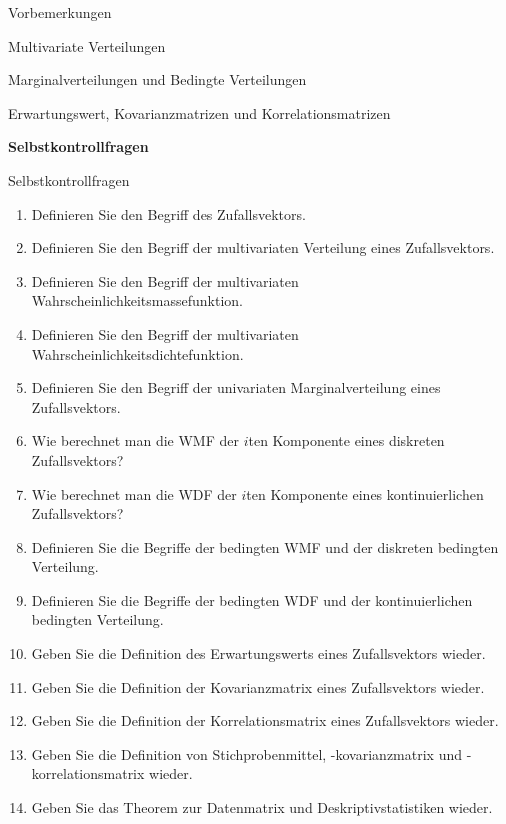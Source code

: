 \documentclass[
  8pt,
  ignorenonframetext,
]{beamer}
\begin{document}
\begin{frame}{}
\protect\hypertarget{section-7}{}
\large
{}
\vfill

Vorbemerkungen

Multivariate Verteilungen

Marginalverteilungen und Bedingte Verteilungen

Erwartungswert, Kovarianzmatrizen und Korrelationsmatrizen

\textbf{Selbstkontrollfragen} \vfill
\end{frame}

\begin{frame}{Selbstkontrollfragen}
\protect\hypertarget{selbstkontrollfragen}{}
\footnotesize
{}
\begin{enumerate}
\item Definieren Sie den Begriff des Zufallsvektors.
\item Definieren Sie den Begriff der multivariaten Verteilung eines Zufallsvektors.
\item Definieren Sie den Begriff der multivariaten Wahrscheinlichkeitsmassefunktion.
\item Definieren Sie den Begriff der multivariaten Wahrscheinlichkeitsdichtefunktion.
\item Definieren Sie den Begriff der univariaten Marginalverteilung eines Zufallsvektors.
\item Wie berechnet man die WMF der $i$ten Komponente eines diskreten Zufallsvektors?
\item Wie berechnet man die WDF der $i$ten Komponente eines kontinuierlichen Zufallsvektors?
\item Definieren Sie die Begriffe der bedingten WMF und der diskreten bedingten Verteilung.
\item Definieren Sie die Begriffe der bedingten WDF und der kontinuierlichen bedingten Verteilung.
\item Geben Sie die Definition des Erwartungswerts eines Zufallsvektors wieder.
\item Geben Sie die Definition der Kovarianzmatrix eines Zufallsvektors wieder.
\item Geben Sie die Definition der Korrelationsmatrix eines Zufallsvektors wieder.
\item Geben Sie die Definition von Stichprobenmittel, -kovarianzmatrix und -korrelationsmatrix wieder.
\item Geben Sie das Theorem zur Datenmatrix und Deskriptivstatistiken wieder.
\end{enumerate}
\end{frame}
\end{document}
